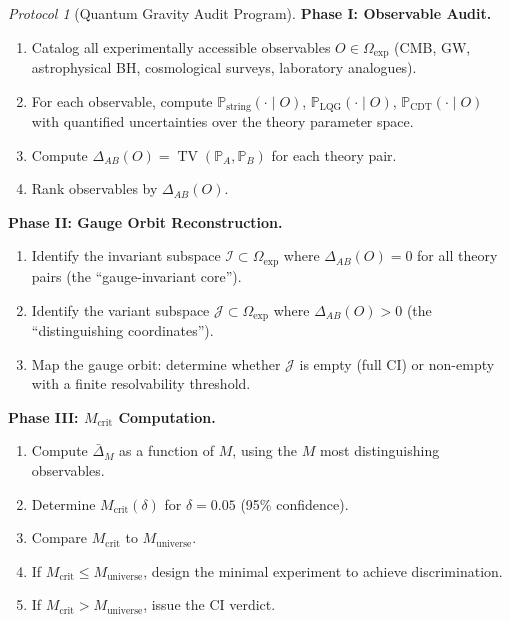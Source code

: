 \documentclass[12pt,a4paper]{article}
\theoremstyle{remark}
\newtheorem{protocol}[theorem]{Protocol}
\newcommand{\Pbb}{\mathbb{P}}
\newcommand{\I}{\mathcal{I}}
\newcommand{\J}{\mathcal{J}}
\newcommand{\CI}{\textsf{CI}}
\DeclareMathOperator{\TV}{TV}
\begin{document}
\begin{protocol}[Quantum Gravity Audit Program]
\label{prot:qg_audit}
\smallskip
\noindent\textbf{Phase I: Observable Audit.}
\begin{enumerate}[leftmargin=*, label=\textbf{I.\arabic*}]
  \item Catalog all experimentally accessible observables $O \in \Omega_{\text{exp}}$ (CMB, GW, astrophysical BH, cosmological surveys, laboratory analogues).
  \item For each observable, compute $\Pbb_{\text{string}}(\cdot \mid O)$, $\Pbb_{\text{LQG}}(\cdot \mid O)$, $\Pbb_{\text{CDT}}(\cdot \mid O)$ with quantified uncertainties over the theory parameter space.
  \item Compute $\Delta_{AB}(O) = \TV(\Pbb_A, \Pbb_B)$ for each theory pair.
  \item Rank observables by $\Delta_{AB}(O)$.
\end{enumerate}

\smallskip
\noindent\textbf{Phase II: Gauge Orbit Reconstruction.}
\begin{enumerate}[leftmargin=*, label=\textbf{II.\arabic*}]
  \item Identify the invariant subspace $\I \subset \Omega_{\text{exp}}$ where $\Delta_{AB}(O) = 0$ for all theory pairs (the ``gauge-invariant core'').
  \item Identify the variant subspace $\J \subset \Omega_{\text{exp}}$ where $\Delta_{AB}(O) > 0$ (the ``distinguishing coordinates'').
  \item Map the gauge orbit: determine whether $\J$ is empty (full \CI{}) or non-empty with a finite resolvability threshold.
\end{enumerate}

\smallskip
\noindent\textbf{Phase III: $M_{\text{crit}}$ Computation.}
\begin{enumerate}[leftmargin=*, label=\textbf{III.\arabic*}]
  \item Compute $\bar{\Delta}_M$ as a function of $M$, using the $M$ most distinguishing observables.
  \item Determine $M_{\text{crit}}(\delta)$ for $\delta = 0.05$ (95\% confidence).
  \item Compare $M_{\text{crit}}$ to $M_{\text{universe}}$.
  \item If $M_{\text{crit}} \leq M_{\text{universe}}$, design the minimal experiment to achieve discrimination.
  \item If $M_{\text{crit}} > M_{\text{universe}}$, issue the \CI{} verdict.
\end{enumerate}


\end{protocol}
\end{document}
